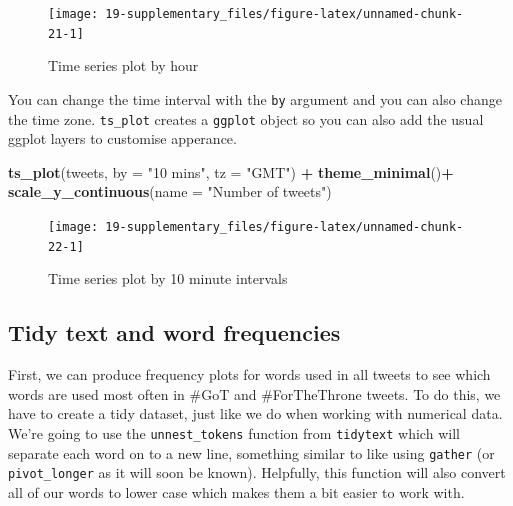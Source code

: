 \documentclass[]{book}
\newenvironment{Shaded}{\begin{snugshade}}{\end{snugshade}}
\newcommand{\DataTypeTok}[1]{\textcolor[rgb]{0.13,0.29,0.53}{#1}}
\newcommand{\KeywordTok}[1]{\textcolor[rgb]{0.13,0.29,0.53}{\textbf{#1}}}
\newcommand{\NormalTok}[1]{#1}
\newcommand{\OperatorTok}[1]{\textcolor[rgb]{0.81,0.36,0.00}{\textbf{#1}}}
\newcommand{\StringTok}[1]{\textcolor[rgb]{0.31,0.60,0.02}{#1}}
\begin{document}
\begin{figure}

{\centering \texttt{[image: 19-supplementary\_files/figure-latex/unnamed-chunk-21-1]} 

}

\caption{Time series plot by hour}\label{fig:unnamed-chunk-21}
\end{figure}

You can change the time interval with the \texttt{by} argument and you can also change the time zone. \texttt{ts\_plot} creates a \texttt{ggplot} object so you can also add the usual ggplot layers to customise apperance.

\begin{Shaded}
\begin{Highlighting}[]
\KeywordTok{ts_plot}\NormalTok{(tweets, }\DataTypeTok{by =} \StringTok{"10 mins"}\NormalTok{, }\DataTypeTok{tz =} \StringTok{"GMT"}\NormalTok{) }\OperatorTok{+}
\StringTok{  }\KeywordTok{theme_minimal}\NormalTok{()}\OperatorTok{+}
\StringTok{  }\KeywordTok{scale_y_continuous}\NormalTok{(}\DataTypeTok{name =} \StringTok{"Number of tweets"}\NormalTok{)}
\end{Highlighting}
\end{Shaded}

\begin{figure}

{\centering \texttt{[image: 19-supplementary\_files/figure-latex/unnamed-chunk-22-1]} 

}

\caption{Time series plot by 10 minute intervals}\label{fig:unnamed-chunk-22}
\end{figure}

\hypertarget{tidy-text-and-word-frequencies}{%
\subsection{Tidy text and word frequencies}\label{tidy-text-and-word-frequencies}}

First, we can produce frequency plots for words used in all tweets to see which words are used most often in \#GoT and \#ForTheThrone tweets. To do this, we have to create a tidy dataset, just like we do when working with numerical data. We're going to use the \texttt{unnest\_tokens} function from \texttt{tidytext} which will separate each word on to a new line, something similar to like using \texttt{gather} (or \texttt{pivot\_longer} as it will soon be known). Helpfully, this function will also convert all of our words to lower case which makes them a bit easier to work with.
\end{document}
